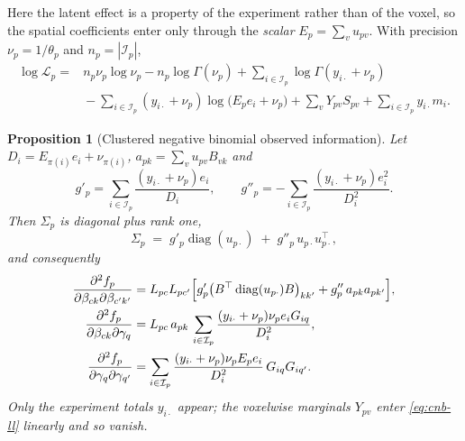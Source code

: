 \documentclass[11pt,a4paper]{article}
\theoremstyle{plain}
\newtheorem{proposition}{Proposition}
\theoremstyle{definition}
\newcommand{\E}{\mathcal{I}}
\newcommand{\diag}{\operatorname{diag}}
\begin{document}
Here the latent effect is a property of the experiment rather than of the voxel, so the spatial
coefficients enter only through the \emph{scalar} $E_p = \sum_v u_{pv}$. With precision
$\nu_p = 1/\theta_p$ and $n_p = |\E_p|$,
\begin{equation}\label{eq:cnb-ll}
\begin{split}
  \log\mathcal{L}_p ={}& n_p \nu_p \log \nu_p - n_p\log\Gamma(\nu_p)
   + \sum_{i\in\E_p}\log\Gamma(y_{i\cdot}+\nu_p)\\
   &{}- \sum_{i\in\E_p}(y_{i\cdot}+\nu_p)\log\bigl(E_p e_i + \nu_p\bigr)
   + \sum_v Y_{pv}S_{pv} + \sum_{i\in\E_p} y_{i\cdot} m_i .
\end{split}
\end{equation}

\begin{proposition}[Clustered negative binomial observed information]\label{prop:cnb}
Let $D_i = E_{\pi(i)} e_i + \nu_{\pi(i)}$, $a_{pk} = \sum_v u_{pv}B_{vk}$ and
\[
  g'_p = \sum_{i\in\E_p} \frac{(y_{i\cdot}+\nu_p)e_i}{D_i},
  \qquad
  g''_p = -\sum_{i\in\E_p} \frac{(y_{i\cdot}+\nu_p)e_i^2}{D_i^2} .
\]
Then $\Sigma_p$ is diagonal plus rank one,
\begin{equation}\label{eq:cnb-sigma}
  \Sigma_p \;=\; g'_p \diag(u_{p\cdot}) \;+\; g''_p\, u_{p\cdot} u_{p\cdot}^\top ,
\end{equation}
and consequently
\begin{align}
  \frac{\partial^2 f_p}{\partial\beta_{ck}\partial\beta_{c'k'}}
   &= L_{pc}L_{pc'}\Bigl[g'_p\bigl(B^\top\diag(u_{p\cdot})B\bigr)_{kk'}
      + g''_p\, a_{pk}a_{pk'}\Bigr],\\
  \frac{\partial^2 f_p}{\partial\beta_{ck}\partial\gamma_q}
   &= L_{pc}\, a_{pk}\, \sum_{i\in\E_p}\frac{(y_{i\cdot}+\nu_p)\nu_p e_i G_{iq}}{D_i^2},\\
  \frac{\partial^2 f_p}{\partial\gamma_q\partial\gamma_{q'}}
   &= \sum_{i\in\E_p}\frac{(y_{i\cdot}+\nu_p)\nu_p E_p e_i}{D_i^2}\,G_{iq}G_{iq'} .
\end{align}
Only the experiment totals $y_{i\cdot}$ appear; the voxelwise marginals $Y_{pv}$ enter
\eqref{eq:cnb-ll} linearly and so vanish.
\end{proposition}
\end{document}
